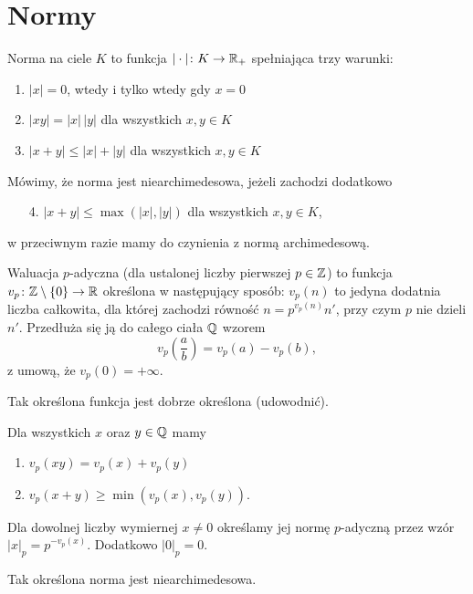 \section{Normy}
\begin{definicja}
	Norma na ciele $K$ to funkcja $|\cdot| \colon K \to \mathbb{R}_+$ spełniająca trzy warunki:
	\begin{enumerate}
		\item $|x| = 0$, wtedy i tylko wtedy gdy $x = 0$
		\item $|xy| = |x|\, |y|$ dla wszystkich $x, y \in K$
		\item $|x+y| \le |x| + |y|$ dla wszystkich $x, y \in K$
	\end{enumerate}
	Mówimy, że norma jest niearchimedesowa, jeżeli zachodzi dodatkowo
	\begin{enumerate}
		\item [4.] $|x+y| \le \max(|x|,|y|)$ dla wszystkich $x, y \in K$,
	\end{enumerate}
	w przeciwnym razie mamy do czynienia z normą archimedesową.
\end{definicja}

\begin{definicja}
	Waluacja $p$-adyczna (dla ustalonej liczby pierwszej $p \in \mathbb{Z}$) to funkcja $v_p \colon \mathbb{Z} \setminus \{0\} \to \mathbb{R}$ określona w następujący sposób: $v_p(n)$ to jedyna dodatnia liczba całkowita, dla której zachodzi równość $n = p^{v_p(n)} n'$, przy czym $p$ nie dzieli $n'$.
	Przedłuża się ją do całego ciała $\mathbb{Q}$ wzorem
	\[
		v_p\left(\dfrac a b\right) = v_p(a) - v_p(b),
	\]
	z umową, że $v_p(0) = + \infty$.
\end{definicja}

Tak określona funkcja jest dobrze określona (udowodnić).

\begin{lemat}
	Dla wszystkich $x$ oraz $y \in \mathbb{Q}$ mamy
	\begin{enumerate}
		\item $v_p(xy) = v_p(x) + v_p(y)$
		\item $v_p(x + y) \ge \min(v_p(x), v_p(y))$.
	\end{enumerate}
\end{lemat}

\begin{definicja}
	Dla dowolnej liczby wymiernej $x \neq 0$ określamy jej normę $p$-adyczną przez wzór $|x|_p = p^{-v_p(x)}$.
	Dodatkowo $|0|_p = 0$.
\end{definicja}

\begin{fakt}
	Tak określona norma jest niearchimedesowa.
\end{fakt}

